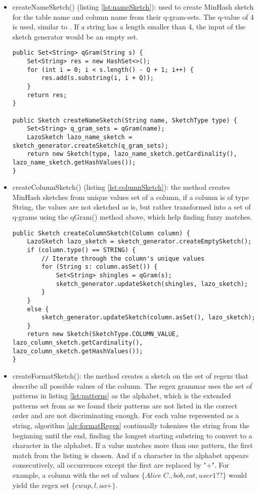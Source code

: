 \begin{itemize}
    \item createNameSketch() (listing \ref{lst:nameSketch}): used to create MinHash sketch for the table name and column name from their q-gram-sets. The q-value of 4 is used, similar to \cite{d3l}. If a string has a length smaller than 4, the input of the sketch generator would be an empty set.
    \begin{lstlisting}[caption=qGram() and createNameSketch() methods, label=lst:nameSketch]
public Set<String> qGram(String s) {
    Set<String> res = new HashSet<>();
    for (int i = 0; i < s.length() - Q + 1; i++) {
        res.add(s.substring(i, i + Q));
    }
    return res;
}

public Sketch createNameSketch(String name, SketchType type) {
    Set<String> q_gram_sets = qGram(name);
    LazoSketch lazo_name_sketch = sketch_generator.createSketch(q_gram_sets);
    return new Sketch(type, lazo_name_sketch.getCardinality(), lazo_name_sketch.getHashValues());
}
    \end{lstlisting}
    
    \item createColumnSketch() (listing \ref{lst:columnSketch}): the method creates MinHash sketches from unique values set of a column, if a column is of type String, the values are not sketched as is, but rather transformed into a set of q-grams using the qGram() method above, which help finding fuzzy matches.

    \begin{lstlisting}[caption=createColumnSketch() method, label=lst:columnSketch]
public Sketch createColumnSketch(Column column) {
    LazoSketch lazo_sketch = sketch_generator.createEmptySketch();
    if (column.type() == STRING) {
        // Iterate through the column's unique values
        for (String s: column.asSet()) {
            Set<String> shingles = qGram(s);
            sketch_generator.updateSketch(shingles, lazo_sketch);
        }
    }
    else {
        sketch_generator.updateSketch(column.asSet(), lazo_sketch);
    }
    return new Sketch(SketchType.COLUMN_VALUE, lazo_column_sketch.getCardinality(), lazo_column_sketch.getHashValues());
}
    \end{lstlisting}
    
    \item createFormatSketch(): the method creates a sketch on the set of regexs that describe all possible values of the column. The regex grammar uses the set of patterns in listing \ref{lst:patterns} as the alphabet, which is the extended patterns set from \cite{d3l} as we found their patterns are not listed in the correct order and are not discriminating enough. For each value represented as a string, algorithm \ref{alg:formatRegex} continually tokenizes the string from the beginning until the end, finding the longest starting substring to convert to a character in the alphabet. If a value matches more than one pattern, the first match from the listing is chosen. And if a character in the alphabet appears consecutively, all occurrences except the first are replaced by "+". For example, a column with the set of values \(\{Alice\;C., bob, cat, user1??\}\) would yield the regex set \(\{cwup, l, ao+\}\). 


\end{itemize}
